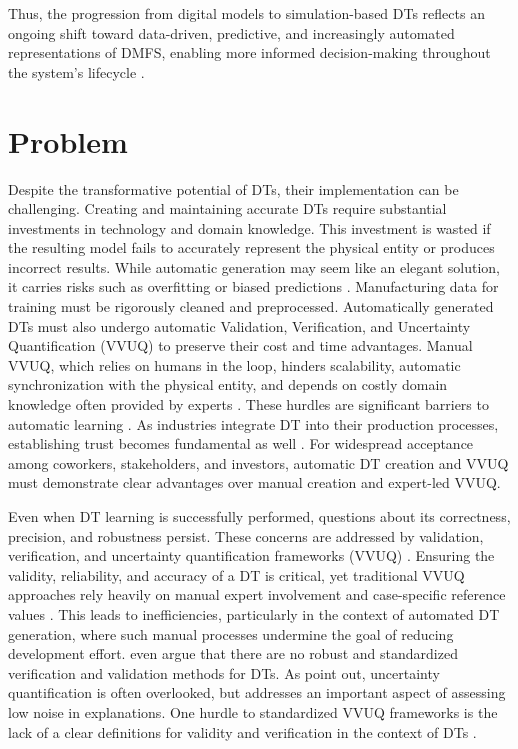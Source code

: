 Thus, the progression from digital models to simulation-based DTs reflects an ongoing shift toward data-driven, predictive, and increasingly automated representations of DMFS, enabling more informed decision-making throughout the system's lifecycle \parencite{boschert2016digital,lim2020state}.

\section{Problem}
Despite the transformative potential of DTs, their implementation can be challenging. Creating and maintaining accurate DTs require substantial investments in technology and domain knowledge. This investment is wasted if the resulting model fails to accurately represent the physical entity or produces incorrect results. While automatic generation may seem like an elegant solution, it carries risks such as overfitting or biased predictions \parencite{gemanbias}. Manufacturing data for training must be rigorously cleaned and preprocessed. Automatically generated DTs must also undergo automatic Validation, Verification, and Uncertainty Quantification (VVUQ) to preserve their cost and time advantages. Manual VVUQ, which relies on humans in the loop, hinders scalability, automatic synchronization with the physical entity, and depends on costly domain knowledge often provided by experts \parencite{Bitencourt2023}. These hurdles are significant barriers to automatic learning \parencite{ribeiro2016should,zhao2024data}. As industries integrate DT into their production processes, establishing trust becomes fundamental as well \parencite{trauer2022digital,arrieta2020explainable}. For widespread acceptance among coworkers, stakeholders, and investors, automatic DT creation and VVUQ must demonstrate clear advantages over manual creation and expert-led VVUQ.

Even when DT learning is successfully performed, questions about its correctness, precision, and robustness persist. These concerns are addressed by validation, verification, and uncertainty quantification frameworks (VVUQ) \parencite{sel2025survey}. Ensuring the validity, reliability, and accuracy of a DT is critical, yet traditional VVUQ approaches rely heavily on manual expert involvement and case-specific reference values \parencite{Bitencourt2023,hua2022validation}. This leads to inefficiencies, particularly in the context of automated DT generation, where such manual processes undermine the goal of reducing development effort. \citeauthor{hua2022validation} even argue that there are no robust and standardized verification and validation methods for DTs. As \autocite{sel2025survey} point out, uncertainty quantification is often overlooked, but addresses an important aspect of assessing low noise in explanations. One hurdle to standardized VVUQ frameworks is the lack of a clear definitions for validity and verification in the context of DTs \parencite{Bitencourt2023}.

